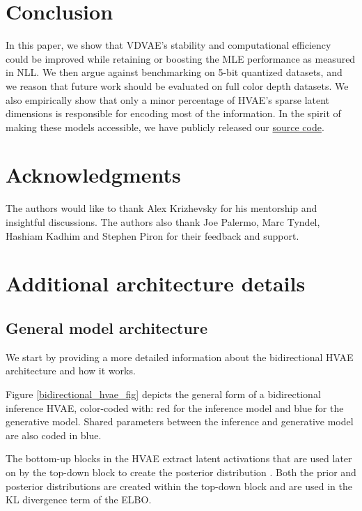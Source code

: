 \documentclass{article}
\begin{document}
\section{Conclusion}
\label{conclusion}

In this paper, we show that VDVAE's stability and computational efficiency could be improved while retaining or boosting the MLE performance as measured in NLL. We then argue against benchmarking on 5-bit quantized datasets, and we reason that future work should be evaluated on full color depth datasets. We also empirically show that only a minor percentage of HVAE's sparse latent dimensions is responsible for encoding most of the information. In the spirit of making these models accessible, we have publicly released our \href{https://github.com/Rayhane-mamah/Efficient-VDVAE}{source code}.


\section*{Acknowledgments}
The authors would like to thank Alex Krizhevsky for his mentorship and insightful discussions. The authors also thank Joe Palermo, Marc Tyndel, Hashiam Kadhim and  Stephen Piron for their feedback and support. 


  
  


\newpage
\appendix

\section{Additional architecture details}
\subsection{General model architecture}
We start by providing a more detailed information about the bidirectional HVAE architecture and how it works.

Figure \ref{bidirectional_hvae_fig} depicts the general form of a bidirectional inference HVAE, color-coded with: red for the inference model and blue for the generative model. Shared parameters between the inference and generative model are also coded in blue. 

The bottom-up blocks in the HVAE extract latent activations  that are used later on by the top-down block to create the posterior distribution . Both the prior and posterior distributions are created within the top-down block and are used in the KL divergence term of the ELBO.
\end{document}
